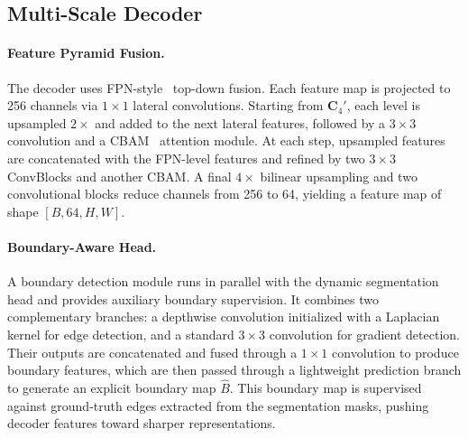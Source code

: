 \documentclass[runningheads]{llncs}
\begin{document}
\subsection{Multi-Scale Decoder}
\label{sec:decoder}

\paragraph{Feature Pyramid Fusion.}
The decoder uses FPN-style~\cite{lin2017fpn} top-down fusion. Each feature map is projected to 256 channels via $1 \times 1$ lateral convolutions. Starting from $\mathbf{C}_4'$, each level is upsampled $2\times$ and added to the next lateral features, followed by a $3 \times 3$ convolution and a CBAM~\cite{woo2018cbam} attention module. At each step, upsampled features are concatenated with the FPN-level features and refined by two $3 \times 3$ ConvBlocks and another CBAM. A final $4\times$ bilinear upsampling and two convolutional blocks reduce channels from 256 to 64, yielding a feature map of shape $[B, 64, H, W]$.

\paragraph{Boundary-Aware Head.}
A boundary detection module runs in parallel with the dynamic segmentation head and provides auxiliary boundary supervision. It combines two complementary branches: a depthwise convolution initialized with a Laplacian kernel for edge detection, and a standard $3 \times 3$ convolution for gradient detection. Their outputs are concatenated and fused through a $1 \times 1$ convolution to produce boundary features, which are then passed through a lightweight prediction branch to generate an explicit boundary map $\hat{B}$. This boundary map is supervised against ground-truth edges extracted from the segmentation masks, pushing decoder features toward sharper representations.
\end{document}

